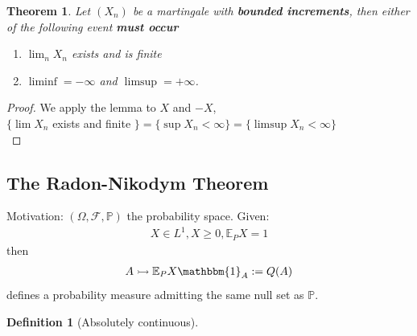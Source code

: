 \documentclass[a4paper,11pt]{book}
\newtheorem{theorem}{Theorem}[section]
\theoremstyle{definition}
\newtheorem{definition}{Definition}[section]
\theoremstyle{remark}
\begin{document}
\begin{theorem}
Let $(X_n)$ be a martingale with \textbf{bounded increments}, then either of the following event \textbf{must occur}
\begin{enumerate}
	\item $\lim_{n} X_n$ exists and is finite
	\item $\liminf = -\infty$ and $\limsup = +\infty$.
\end{enumerate}	
\end{theorem}
\begin{proof}
	We apply the lemma to $X$ and $-X$,\\
 	$\{ \lim X_n$ exists and finite $\} = \{ \sup X_n < \infty\} = \{\limsup X_n < \infty\}$\\ 
\end{proof}


\subsection{The Radon-Nikodym Theorem}
Motivation: $(\Omega, \mathcal{F}, \mathbb{P})$ the probability space. Given:
\begin{align*}
	X \in L^1, X \geq 0, \mathbb{E}_PX = 1
\end{align*}
then 
\begin{align*}
	A \rightarrowtail \mathbb{E}_P X \mathbbm{1}_{A}:= Q(A)
\end{align*}
defines a probability measure admitting the same null set as $\mathbb{P}$.

\begin{definition}[Absolutely continuous]
\end{definition}
\end{document}
